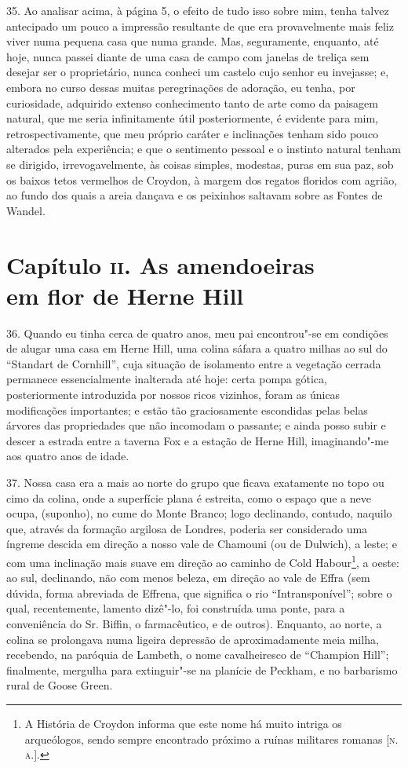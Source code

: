 35. Ao analisar acima, à página 5, o efeito de tudo isso sobre mim,
tenha talvez antecipado um pouco a impressão resultante de que era
provavelmente mais feliz viver numa pequena casa que numa grande. Mas,
seguramente, enquanto, até hoje, nunca passei diante de uma casa de
campo com janelas de treliça sem desejar ser o proprietário, nunca
conheci um castelo cujo senhor eu invejasse; e, embora no curso dessas
muitas peregrinações de adoração, eu tenha, por curiosidade, adquirido
extenso conhecimento tanto de arte como da paisagem natural, que me
seria infinitamente útil posteriormente, é evidente para mim,
retrospectivamente, que meu próprio caráter e inclinações tenham sido
pouco alterados pela experiência; e que o sentimento pessoal e o
instinto natural tenham se dirigido, irrevogavelmente, às coisas
simples, modestas, puras em sua paz, sob os baixos tetos vermelhos de
Croydon, à margem dos regatos floridos com agrião, ao fundo dos quais a
areia dançava e os peixinhos saltavam sobre as Fontes de Wandel.

\chapter[Capítulo \textsc{ii}. As amendoeiras em flor de Herne Hill]{Capítulo \textsc{ii}. As amendoeiras\\ em flor de Herne Hill}

36. Quando eu tinha cerca de quatro anos, meu pai encontrou"-se em
condições de alugar uma casa em Herne Hill, uma colina sáfara a quatro
milhas ao sul do ``Standart de Cornhill'', cuja situação de isolamento
entre a vegetação cerrada permanece essencialmente inalterada até hoje:
certa pompa gótica, posteriormente introduzida por nossos ricos
vizinhos, foram as únicas modificações importantes; e estão tão
graciosamente escondidas pelas belas árvores das propriedades que não
incomodam o passante; e ainda posso subir e descer a estrada entre a
taverna Fox e a estação de Herne Hill, imaginando"-me aos quatro anos de
idade.

37. Nossa casa era a mais ao norte do grupo que ficava exatamente no
topo ou cimo da colina, onde a superfície plana é estreita, como o
espaço que a neve ocupa, (suponho), no cume do Monte Branco; logo
declinando, contudo, naquilo que, através da formação argilosa de
Londres, poderia ser considerado uma íngreme descida em direção a nosso
vale de Chamouni (ou de Dulwich), a leste; e com uma inclinação mais
suave em direção ao caminho de Cold Habour\footnote{A História de
  Croydon informa que este nome há muito intriga os arqueólogos, sendo
  sempre encontrado próximo a ruínas militares romanas {[}\textsc{n.\,a.}{]}.},
a oeste: ao sul, declinando, não com menos beleza, em direção ao vale de
Effra (sem dúvida, forma abreviada de Effrena, que significa o rio
``Intransponível''; sobre o qual, recentemente, lamento dizê"-lo, foi
construída uma ponte, para a conveniência do Sr. Biffin, o farmacêutico,
e de outros). Enquanto, ao norte, a colina se prolongava numa ligeira
depressão de aproximadamente meia milha, recebendo, na paróquia de
Lambeth, o nome cavalheiresco de ``Champion Hill''; finalmente, mergulha
para extinguir"-se na planície de Peckham, e no barbarismo rural de Goose
Green.


